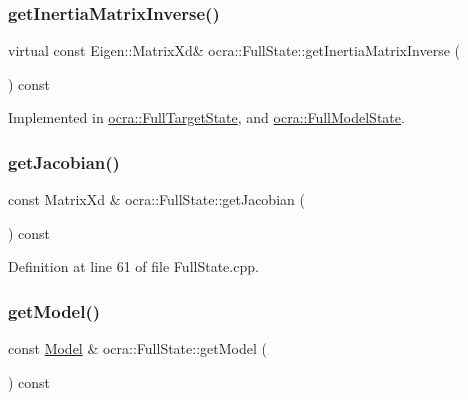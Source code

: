 \subsubsection{\texorpdfstring{get\+Inertia\+Matrix\+Inverse()}{getInertiaMatrixInverse()}}
{\footnotesize\ttfamily virtual const Eigen\+::\+Matrix\+Xd\& ocra\+::\+Full\+State\+::get\+Inertia\+Matrix\+Inverse (\begin{DoxyParamCaption}{ }\end{DoxyParamCaption}) const\hspace{0.3cm}{\ttfamily [pure virtual]}}



Implemented in \hyperlink{classocra_1_1FullTargetState_a55194b2f5683696eeee538cb93f3403a}{ocra\+::\+Full\+Target\+State}, and \hyperlink{classocra_1_1FullModelState_adf7ce7128a112c3f2b6367b6c0f6b9a2}{ocra\+::\+Full\+Model\+State}.

\hypertarget{classocra_1_1FullState_ada4a4e3af758b4af2ba95516eaad74e1}{}\label{classocra_1_1FullState_ada4a4e3af758b4af2ba95516eaad74e1} 
\subsubsection{\texorpdfstring{get\+Jacobian()}{getJacobian()}}
{\footnotesize\ttfamily const Matrix\+Xd \& ocra\+::\+Full\+State\+::get\+Jacobian (\begin{DoxyParamCaption}{ }\end{DoxyParamCaption}) const}



Definition at line 61 of file Full\+State.\+cpp.

\hypertarget{classocra_1_1FullState_a97f2718a0f72e69c829d67db4514af68}{}\label{classocra_1_1FullState_a97f2718a0f72e69c829d67db4514af68} 
\subsubsection{\texorpdfstring{get\+Model()}{getModel()}}
{\footnotesize\ttfamily const \hyperlink{classocra_1_1Model}{Model} \& ocra\+::\+Full\+State\+::get\+Model (\begin{DoxyParamCaption}{ }\end{DoxyParamCaption}) const}



